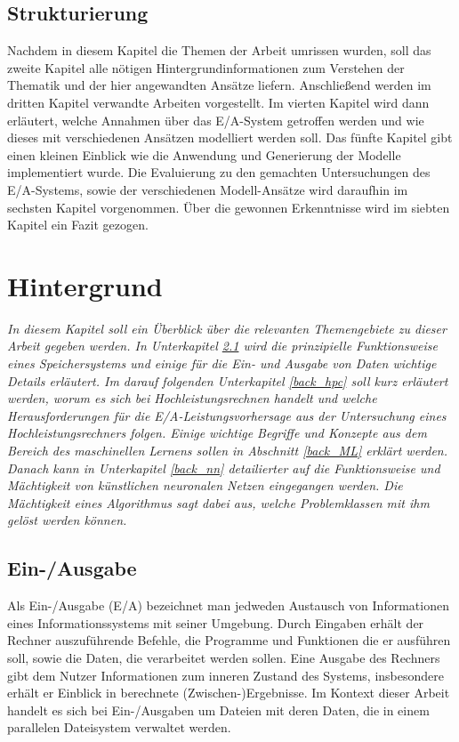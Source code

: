 \documentclass[
	twoside,
	12pt,
	a4paper,
	BCOR10mm,
	DIV14,
	listof=totoc,
	bibliography=totoc,
	headsepline
]{scrreprt}
\begin{document}
\section{Strukturierung}
Nachdem in diesem Kapitel die Themen der Arbeit umrissen wurden, soll das zweite Kapitel alle nötigen Hintergrundinformationen zum Verstehen der Thematik und der hier angewandten Ansätze liefern. Anschließend werden im dritten Kapitel verwandte Arbeiten vorgestellt.
Im vierten Kapitel wird dann erläutert, welche Annahmen über das E/A-System getroffen werden und wie dieses mit verschiedenen Ansätzen modelliert werden soll.
Das fünfte Kapitel gibt einen kleinen Einblick wie die Anwendung und Generierung der Modelle implementiert wurde.
Die Evaluierung zu den gemachten Untersuchungen des E/A-Systems, sowie der verschiedenen Modell-Ansätze wird daraufhin im sechsten Kapitel vorgenommen.
Über die gewonnen Erkenntnisse wird im siebten Kapitel ein Fazit gezogen.
\bigskip

\chapter{Hintergrund}
\label{Hintergrund}
\textit{
	In diesem Kapitel soll ein Überblick über die relevanten Themengebiete zu dieser Arbeit gegeben werden.
	In Unterkapitel \ref{back_E/A} wird die prinzipielle Funktionsweise eines Speichersystems und einige für die Ein- und Ausgabe von Daten wichtige Details erläutert.
	Im darauf folgenden Unterkapitel \ref{back_hpc} soll kurz erläutert werden, worum es sich bei Hochleistungsrechnen handelt und welche Herausforderungen für die E/A-Leistungsvorhersage aus der Untersuchung eines Hochleistungsrechners folgen.
	Einige wichtige Begriffe und Konzepte aus dem Bereich des maschinellen Lernens sollen in Abschnitt \ref{back_ML} erklärt werden.
	Danach kann in Unterkapitel \ref{back_nn} detailierter auf die Funktionsweise und Mächtigkeit von künstlichen neuronalen Netzen eingegangen werden. Die Mächtigkeit eines Algorithmus sagt dabei aus, welche Problemklassen mit ihm gelöst werden können. 
}
\bigskip

\section{Ein-/Ausgabe}
\label{back_E/A}
Als Ein-/Ausgabe (E/A) bezeichnet man jedweden Austausch von Informationen eines Informationssystems mit seiner Umgebung. Durch Eingaben erhält der Rechner auszuführende Befehle, die Programme und Funktionen die er ausführen soll, sowie die Daten, die verarbeitet werden sollen.
Eine Ausgabe des Rechners gibt dem Nutzer Informationen zum inneren Zustand des Systems, insbesondere erhält er Einblick in berechnete (Zwischen-)Ergebnisse.  
Im Kontext dieser Arbeit handelt es sich bei Ein-/Ausgaben um Dateien mit deren Daten, die in einem parallelen Dateisystem verwaltet werden.
\medskip
\end{document}
